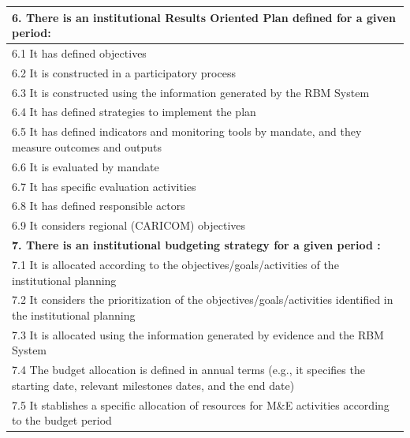 \documentclass[
  10pt,
]{book}
\begin{document}
\begin{table}
\begin{tabular}[t]{l}
\hline
\multicolumn{1}{l}{\textbf{6. There is an institutional Results Oriented Plan defined for a given period:}}\\
\hline
\hspace{1em}6.1 It has defined objectives\\
\hline
\hspace{1em}6.2 It is constructed in a participatory process\\
\hline
\hspace{1em}6.3 It is constructed using the information generated by the RBM System\\
\hline
\hspace{1em}6.4 It has defined strategies to implement the plan\\
\hline
\hspace{1em}6.5 It has defined indicators and monitoring tools by mandate, and they measure outcomes and outputs\\
\hline
\hspace{1em}6.6 It is evaluated by mandate\\
\hline
\hspace{1em}6.7 It has specific evaluation activities\\
\hline
\hspace{1em}6.8 It has defined responsible actors\\
\hline
\hspace{1em}6.9 It considers regional (CARICOM) objectives\\
\hline
\multicolumn{1}{l}{\textbf{7. There is an institutional budgeting strategy for a given period :}}\\
\hline
\hspace{1em}7.1 It is allocated according to the objectives/goals/activities of the institutional planning\\
\hline
\hspace{1em}7.2 It considers the prioritization of the objectives/goals/activities identified in the institutional planning\\
\hline
\hspace{1em}7.3 It is allocated using the information generated by evidence and the RBM System\\
\hline
\hspace{1em}7.4 The budget allocation is defined in annual terms (e.g., it specifies the starting date, relevant milestones dates, and the end date)\\
\hline
\hspace{1em}7.5 It stablishes a specific allocation of resources for M\&E activities according to the budget period\\

\end{tabular}
\end{table}
\end{document}
